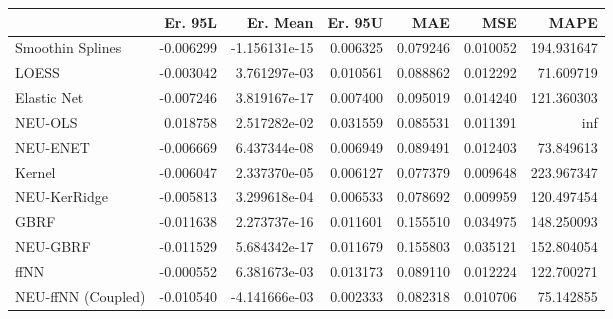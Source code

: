 \begin{tabular}{lrrrrrr}
\toprule
{} &   Er. 95L &      Er. Mean &   Er. 95U &       MAE &       MSE &        MAPE \\
\midrule
Smoothin Splines   & -0.006299 & -1.156131e-15 &  0.006325 &  0.079246 &  0.010052 &  194.931647 \\
LOESS              & -0.003042 &  3.761297e-03 &  0.010561 &  0.088862 &  0.012292 &   71.609719 \\
Elastic Net        & -0.007246 &  3.819167e-17 &  0.007400 &  0.095019 &  0.014240 &  121.360303 \\
NEU-OLS            &  0.018758 &  2.517282e-02 &  0.031559 &  0.085531 &  0.011391 &         inf \\
NEU-ENET           & -0.006669 &  6.437344e-08 &  0.006949 &  0.089491 &  0.012403 &   73.849613 \\
Kernel             & -0.006047 &  2.337370e-05 &  0.006127 &  0.077379 &  0.009648 &  223.967347 \\
NEU-KerRidge       & -0.005813 &  3.299618e-04 &  0.006533 &  0.078692 &  0.009959 &  120.497454 \\
GBRF               & -0.011638 &  2.273737e-16 &  0.011601 &  0.155510 &  0.034975 &  148.250093 \\
NEU-GBRF           & -0.011529 &  5.684342e-17 &  0.011679 &  0.155803 &  0.035121 &  152.804054 \\
ffNN               & -0.000552 &  6.381673e-03 &  0.013173 &  0.089110 &  0.012224 &  122.700271 \\
NEU-ffNN (Coupled) & -0.010540 & -4.141666e-03 &  0.002333 &  0.082318 &  0.010706 &   75.142855 \\
\bottomrule
\end{tabular}
